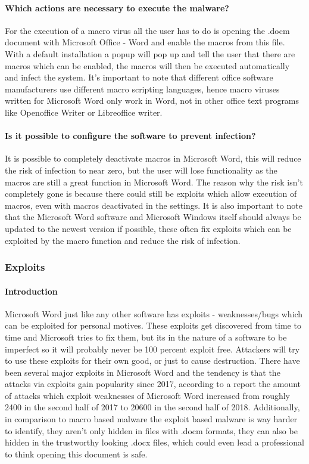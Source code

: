 \documentclass[a4paper,10pt]{article}
\begin{document}
\paragraph*{Which actions are necessary to execute the malware?}
For the execution of a macro virus all the user has to do is opening the .docm document with Microsoft Office - Word and enable the macros from this file.\cite{7762928} With a default installation a popup will pop up and tell the user that there are macros which can be enabled, the macros will then be executed automatically and infect the system. It's important to note that different office software manufacturers use different macro scripting languages, hence macro viruses written for Microsoft Word only work in Word, not in other office text programs like Openoffice Writer or Libreoffice writer.
\paragraph*{Is it possible to configure the software to prevent infection?}
It is possible to completely deactivate macros in Microsoft Word, this will reduce the risk of infection to near zero, but the user will lose functionality as the macros are still a great function in Microsoft Word. The reason why the risk isn't completely gone is because there could still be exploits which allow execution of macros, even with macros deactivated in the settings. It is also important to note that the Microsoft Word software and Microsoft Windows itself should always be updated to the newest version if possible, these often fix exploits which can be exploited by the macro function and reduce the risk of infection.

\subsubsection{Exploits}
\paragraph*{Introduction}
Microsoft Word just like any other software has exploits - weaknesses/bugs which can be exploited for personal motives. These exploits get discovered from time to time\cite{microsoftwordcve} and Microsoft tries to fix them, but its in the nature of a software to be imperfect so it will probably never be 100 percent exploit free. Attackers will try to use these exploits for their own good, or just to cause destruction. There have been several major exploits in Microsoft Word and the tendency is that the attacks via exploits gain popularity since 2017, according to a report the amount of attacks which exploit weaknesses of Microsoft Word increased from roughly 2400 in the second half of 2017 to 20600 in the second half of 2018.\cite{balangcod_2019} Additionally, in comparison to macro based malware the exploit based malware is way harder to identify, they aren't only hidden in files with .docm formats, they can also be hidden in the trustworthy looking .docx files, which could even lead a professional to think opening this document is safe.
\end{document}
